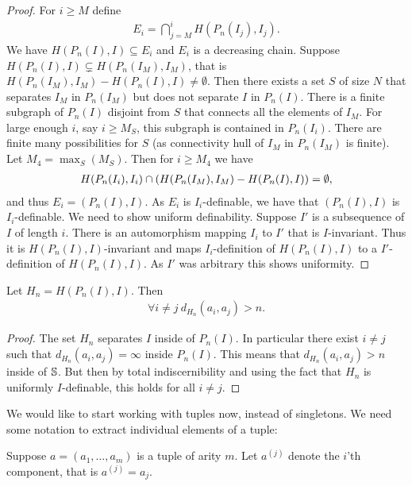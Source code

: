 \begin{proof}
  For $i \geq M$ define
  \begin{align*}
    E_i = \bigcap_{j = M}^{i} H(P_n(I_j), I_j).
  \end{align*}
  We have $H(P_n(I), I) \subseteq E_i$ and $E_i$ is a decreasing chain.
  Suppose $H(P_n(I), I) \subsetneq H(P_n(I_M), I_M)$, that is ${H(P_n(I_M), I_M) - H(P_n(I), I)} \neq \emptyset$.
  Then there exists a set $S$ of size $N$ that separates $I_M$ in $P_n(I_M)$ but does not separate $I$ in $P_n(I)$.
  There is a finite subgraph of $P_n(I)$ disjoint from $S$ that connects all the elements of $I_M$.
  For large enough $i$, say $i \geq M_S$, this subgraph is contained in $P_n(I_i)$.
  There are finite many possibilities for $S$ (as connectivity hull of $I_M$ in $P_n(I_M)$ is finite).
  Let $M_4 = \max_S(M_S)$.
  Then for $i \geq M_4$ we have
  \begin{align*}
    H(P_n(I_i), I_i) \cap \left(H(P_n(I_M), I_M) - H(P_n(I), I)\right) = \emptyset,    
  \end{align*}
  and thus $E_i = (P_n(I), I)$.
  As $E_i$ is $I_i$-definable, we have that $(P_n(I), I)$ is $I_i$-definable.
  We need to show uniform definability.
  Suppose $I'$ is a subsequence of $I$ of length $i$.
  There is an automorphism mapping $I_i$ to $I'$ that is $I$-invariant.
  Thus it is $H(P_n(I), I)$-invariant and maps $I_i$-definition of $H(P_n(I), I)$ to a $I'$-definition of $H(P_n(I), I)$.
  As $I'$ was arbitrary this shows uniformity.
\end{proof}

\begin{Corollary} \label{inf_dis}
  Let $H_n = H(P_n(I), I)$.
  Then 
  \begin{align*}
    \forall i \neq j \ d_{H_n}(a_i, a_j) > n.
  \end{align*}
\end{Corollary}

\begin{proof}
  The set $H_n$ separates $I$ inside of $P_n(I)$.
  In particular there exist $i \neq j$ such that $d_{H_n}(a_i, a_j) = \infty$ inside $P_n(I)$.
  This means that $d_{H_n}(a_i, a_j) > n$ inside of $\mathbb S$.
  But then by total indiscernibility and using the fact that $H_n$ is uniformly $I$-definable, this holds for all $i \neq j$.
\end{proof}

\newcommand{\tpl}[2]{{#1}^{(#2)}}

We would like to start working with tuples now, instead of singletons.
We need some notation to extract individual elements of a tuple:
\begin{Definition}
  Suppose $a = (a_1, \ldots, a_m)$ is a tuple of arity $m$.
  Let $\tpl{a}{j}$ denote the $i$'th component, that is $\tpl{a}{j} = a_j$.
\end{Definition}

